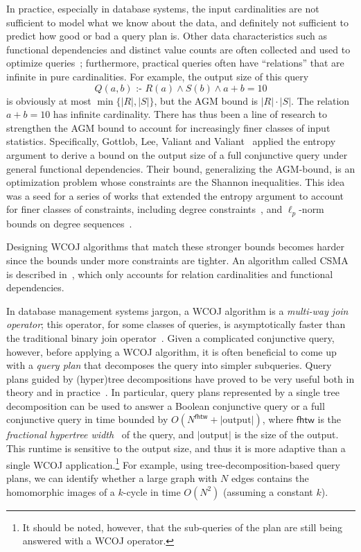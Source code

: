 \documentclass[10pt,a4paper]{article}
\newcommand{\cd}{\text{ :- }}
\newcommand{\agm}{\textsf{AGM}\xspace}
\newcommand{\csma}{\textsf{CSMA}\xspace}
\newcommand{\fhtw}{\textsf{fhtw}}
\begin{document}
In practice, especially in database systems, the input cardinalities are not sufficient to
model what we know about the data, and definitely not sufficient to predict how good or bad
a query plan is. Other data characteristics such as functional dependencies and distinct
value counts are often collected and used to optimize queries~\cite{DBLP:conf/icdt/000122,DBLP:journals/pvldb/LeisGMBK015};
furthermore, practical queries often have ``relations'' that are infinite in pure
cardinalities. For example, the output size of this query
\[ Q(a,b) \cd R(a) \wedge S(b) \wedge a+b=10 \] is obviously at most $\min\{|R|,|S|\}$, but
the \agm bound is $|R|\cdot |S|$. The relation $a+b=10$ has infinite cardinality. There
has thus been a line of research to strengthen the \agm bound to account for increasingly
finer classes of input statistics.
Specifically, Gottlob, Lee, Valiant and Valiant~\cite{DBLP:journals/jacm/GottlobLVV12,DBLP:conf/pods/GottlobLV09}
applied the entropy argument to derive a bound on the output size of a full conjunctive query
under general functional dependencies. Their bound, generalizing the \agm-bound, is an optimization
problem whose constraints are the Shannon inequalities.
This idea was a seed for a series of works that extended the entropy argument to account for
finer classes of constraints, including degree constraints~\cite{DBLP:conf/pods/KhamisNS16,
DBLP:conf/pods/Khamis0S17,10.1145/3651597}, and
$\ell_p$-norm bounds on degree sequences~\cite{10.1145/3651597}.

Designing WCOJ algorithms that match these stronger
bounds becomes harder since the bounds under more constraints are tighter. An algorithm
called  \csma is described in~\cite{DBLP:conf/pods/KhamisNS16}, which only accounts for
relation cardinalities and functional dependencies.

In database management systems jargon, a WCOJ algorithm is a {\em multi-way join operator};
this operator, for some classes of queries, is asymptotically faster than the traditional
binary join operator~\cite{DBLP:journals/jacm/NgoPRR18}. Given a complicated conjunctive query,
however, before applying a WCOJ algorithm, it is often beneficial to come up with a {\em
query plan} that decomposes the query into simpler subqueries. Query plans guided by
(hyper)tree decompositions have proved to be very useful both in theory and in
practice~\cite{DBLP:conf/pods/GottlobGLS16}. In particular, query plans represented by a
single tree decomposition can be used to answer a Boolean conjunctive query or a full
conjunctive query in time bounded by $O(N^{\fhtw}+|\text{output}|)$, where $\fhtw$ is
the {\em fractional hypertree width}~\cite{DBLP:journals/talg/GroheM14} of the query, and
$|\text{output}|$ is the size of the output. This runtime is sensitive to the output size,
and thus it is more adaptive than a single WCOJ application.\footnote{It should be noted,
however, that the sub-queries of the plan are still being answered with a WCOJ operator.}
For example, using tree-decomposition-based query plans, we can identify whether a large
graph with $N$ edges contains the homomorphic images of a $k$-cycle in time $O(N^2)$
(assuming a constant $k$).
\end{document}
